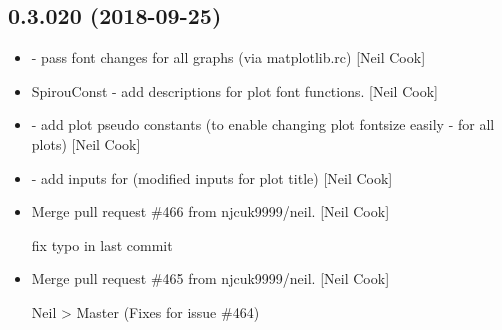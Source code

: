 \documentclass[a4paper,10pt,english]{report}
\begin{document}
\subsection{0.3.020 (2018-09-25)}
\label{\detokenize{misc/changelog:id312}}\begin{itemize}
\item {} 
 - pass font changes for all graphs (via matplotlib.rc)
{[}Neil Cook{]}

\item {} 
SpirouConst - add descriptions for plot font functions. {[}Neil Cook{]}

\item {} 
 - add plot pseudo constants (to enable changing plot
fontsize easily - for all plots) {[}Neil Cook{]}

\item {} 
 - add inputs for  (modified
inputs for plot title) {[}Neil Cook{]}

\item {} 
Merge pull request \#466 from njcuk9999/neil. {[}Neil Cook{]}

fix typo in last commit

\item {} 
Merge pull request \#465 from njcuk9999/neil. {[}Neil Cook{]}

Neil \textendash{}\textgreater{} Master (Fixes for issue \#464)

\end{itemize}
\end{document}
